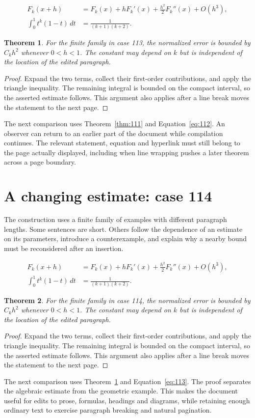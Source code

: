 \documentclass[a4paper,10pt]{article}
\newtheorem{theorem}{Theorem}[section]
\begin{document}
\lipsum[7-8]
\begin{align}\label{eq:112}
 F_k(x+h)&=F_k(x)+hF_k'(x)+\frac{h^2}{2}F_k''(x)+O(h^3),\\
 \int_0^1 t^k(1-t)\,dt&=\frac{1}{(k+1)(k+2)}.
\end{align}
\begin{theorem}\label{thm:112}
For the finite family in case 113, the normalized error is bounded by $C_k h^2$ whenever $0<h<1$. The constant may depend on $k$ but is independent of the location of the edited paragraph.
\end{theorem}
\begin{proof}
Expand the two terms, collect their first-order contributions, and apply the
triangle inequality. The remaining integral is bounded on the compact interval,
so the asserted estimate follows. This argument also applies after a line break
moves the statement to the next page.
\end{proof}
The next comparison uses Theorem~\ref{thm:111} and Equation~\ref{eq:112}. An observer can return to an earlier part of the document while compilation continues. The relevant statement, equation and hyperlink must still belong to the page actually displayed, including when line wrapping pushes a later theorem across a page boundary.

\lipsum[13]

\section{A changing estimate: case 114}\label{unit:113}
The construction uses a finite family of examples with different paragraph lengths. Some sentences are short. Others follow the dependence of an estimate on its parameters, introduce a counterexample, and explain why a nearby bound must be reconsidered after an insertion.

\lipsum[10-11]
\begin{align}\label{eq:113}
 F_k(x+h)&=F_k(x)+hF_k'(x)+\frac{h^2}{2}F_k''(x)+O(h^3),\\
 \int_0^1 t^k(1-t)\,dt&=\frac{1}{(k+1)(k+2)}.
\end{align}
\begin{theorem}\label{thm:113}
For the finite family in case 114, the normalized error is bounded by $C_k h^2$ whenever $0<h<1$. The constant may depend on $k$ but is independent of the location of the edited paragraph.
\end{theorem}
\begin{proof}
Expand the two terms, collect their first-order contributions, and apply the
triangle inequality. The remaining integral is bounded on the compact interval,
so the asserted estimate follows. This argument also applies after a line break
moves the statement to the next page.
\end{proof}
The next comparison uses Theorem~\ref{thm:112} and Equation~\ref{eq:113}. The proof separates the algebraic estimate from the geometric example. This makes the document useful for edits to prose, formulas, headings and diagrams, while retaining enough ordinary text to exercise paragraph breaking and natural pagination.
\end{document}

